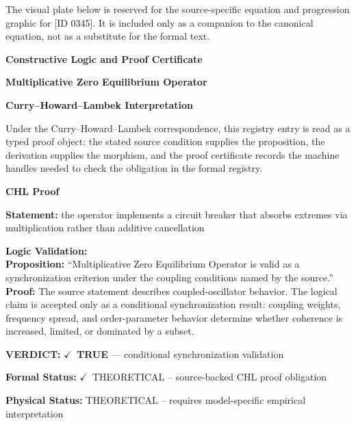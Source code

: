 \begingroup\footnotesize\sloppy
The visual plate below is reserved for the source-specific equation and progression graphic for [ID 0345]. It is included only as a companion to the canonical equation, not as a substitute for the formal text.
\par\endgroup
\ifTZPDarkEdition
{}
\fi

\clearpage
\begingroup\tzpsupportsetup
\noindent\textbf{\fontsize{10.8pt}{12.8pt}\selectfont [ID 0345] Constructive Logic and Proof Certificate}\par
\noindent\textbf{\fontsize{10pt}{12pt}\selectfont Multiplicative Zero Equilibrium Operator}\par
\vspace{0.45em}
\begingroup
\footnotesize
\setlength{\parskip}{0.22em}
\setlength{\parindent}{0pt}
\noindent\textbf{Curry--Howard--Lambek Interpretation}\par
Under the Curry--Howard--Lambek correspondence, this registry entry is read as a typed proof
object: the stated source condition supplies the proposition, the derivation supplies the
morphism, and the proof certificate records the machine handles needed to check the obligation
in the formal registry.

\vspace{0.45em}
\noindent\textbf{CHL Proof}\par
\textbf{Statement:} the operator implements a circuit breaker that absorbs extremes via multiplication
rather than additive cancellation

\textbf{Logic Validation:}\\
\textbf{Proposition:} ``Multiplicative Zero Equilibrium Operator is valid as a synchronization criterion under
the coupling conditions named by the source.''\\
\textbf{Proof:} The source statement describes coupled-oscillator behavior. The logical claim is
accepted only as a conditional synchronization result: coupling weights, frequency
spread, and order-parameter behavior determine whether coherence is increased, limited,
or dominated by a subset.

\textbf{VERDICT:} \ensuremath{\checkmark}\ \textbf{TRUE} --- conditional synchronization validation

\textbf{Formal Status:} \ensuremath{\checkmark}\ THEORETICAL -- source-backed CHL proof obligation

\textbf{Physical Status:} THEORETICAL -- requires model-specific empirical interpretation
\par\vspace{0.45em}
\par
\ifTZPDarkEdition
{}
\fi
\endgroup
\endgroup
